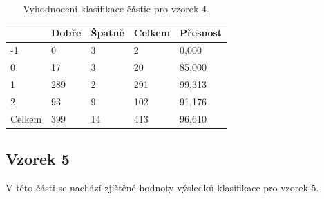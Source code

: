 \documentclass[11pt,twoside,a4paper,table]{book}
\begin{document}
\begin{table}[h]
\begin{center}
\begin{tabular}{lllll}
\rowcolor[HTML]{9B9B9B} 
\multicolumn{1}{|l|}{\cellcolor[HTML]{9B9B9B}Třída} & \multicolumn{1}{l|}{\cellcolor[HTML]{9B9B9B}Dobře} & \multicolumn{1}{l|}{\cellcolor[HTML]{9B9B9B}Špatně}  & \multicolumn{1}{l|}{\cellcolor[HTML]{9B9B9B}Celkem} & \multicolumn{1}{l|}{\cellcolor[HTML]{9B9B9B}Přesnost} \\ \hline
\multicolumn{1}{|l|}{-1}                            & \multicolumn{1}{l|}{0}                             & \multicolumn{1}{l|}{3}                               & \multicolumn{1}{l|}{2}                              & \multicolumn{1}{l|}{0,000}                            \\ \hline
\multicolumn{1}{|l|}{0}                             & \multicolumn{1}{l|}{17}                            & \multicolumn{1}{l|}{3}                               & \multicolumn{1}{l|}{20}                             & \multicolumn{1}{l|}{85,000}                           \\ \hline
\multicolumn{1}{|l|}{1}                             & \multicolumn{1}{l|}{289}                           & \multicolumn{1}{l|}{2}                               & \multicolumn{1}{l|}{291}                            & \multicolumn{1}{l|}{99,313}                           \\ \hline
\multicolumn{1}{|l|}{2}                             & \multicolumn{1}{l|}{93}                            & \multicolumn{1}{l|}{9}                               & \multicolumn{1}{l|}{102}                            & \multicolumn{1}{l|}{91,176}                           \\ \hline
\multicolumn{1}{|l|}{Celkem}                        & \multicolumn{1}{l|}{399}                           & \multicolumn{1}{l|}{14}                              & \multicolumn{1}{l|}{413}                            & \multicolumn{1}{l|}{96,610}                           \\ \hline
\end{tabular}
\end{center}
\caption{Vyhodnocení klasifikace částic pro vzorek 4.}
\label{tab:classresult5}
\end{table}

\FloatBarrier
\subsection{Vzorek 5}
V této části se nachází zjištěné hodnoty výsledků klasifikace pro vzorek 5.
\end{document}
